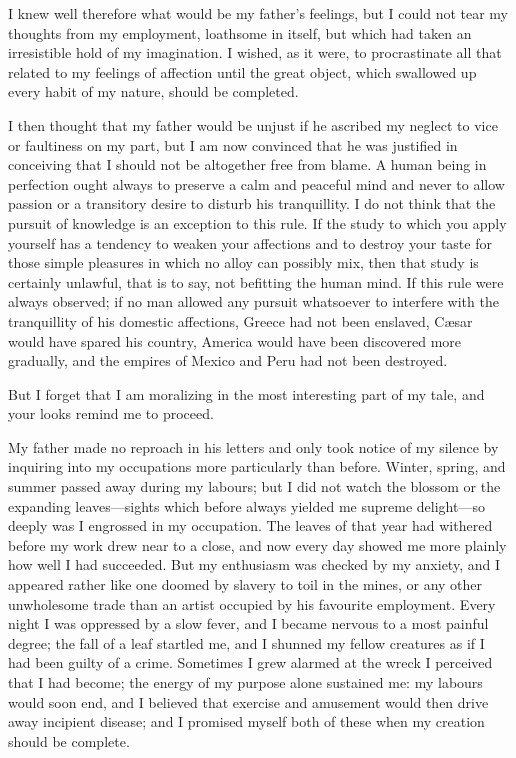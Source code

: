 \documentclass[12pt,openright]{book}
\begin{document}
I knew well therefore what would be my father’s feelings, but I could not tear my thoughts from my employment, loathsome in itself, but which had taken an irresistible hold of my imagination. I wished, as it were, to procrastinate all that related to my feelings of affection until the great object, which swallowed up every habit of my nature, should be completed.

I then thought that my father would be unjust if he ascribed my neglect to vice or faultiness on my part, but I am now convinced that he was justified in conceiving that I should not be altogether free from blame. A human being in perfection ought always to preserve a calm and peaceful mind and never to allow passion or a transitory desire to disturb his tranquillity. I do not think that the pursuit of knowledge is an exception to this rule. If the study to which you apply yourself has a tendency to weaken your affections and to destroy your taste for those simple pleasures in which no alloy can possibly mix, then that study is certainly unlawful, that is to say, not befitting the human mind. If this rule were always observed; if no man allowed any pursuit whatsoever to interfere with the tranquillity of his domestic affections, Greece had not been enslaved, Cæsar would have spared his country, America would have been discovered more gradually, and the empires of Mexico and Peru had not been destroyed.

But I forget that I am moralizing in the most interesting part of my tale, and your looks remind me to proceed.

My father made no reproach in his letters and only took notice of my silence by inquiring into my occupations more particularly than before. Winter, spring, and summer passed away during my labours; but I did not watch the blossom or the expanding leaves—sights which before always yielded me supreme delight—so deeply was I engrossed in my occupation. The leaves of that year had withered before my work drew near to a close, and now every day showed me more plainly how well I had succeeded. But my enthusiasm was checked by my anxiety, and I appeared rather like one doomed by slavery to toil in the mines, or any other unwholesome trade than an artist occupied by his favourite employment. Every night I was oppressed by a slow fever, and I became nervous to a most painful degree; the fall of a leaf startled me, and I shunned my fellow creatures as if I had been guilty of a crime. Sometimes I grew alarmed at the wreck I perceived that I had become; the energy of my purpose alone sustained me: my labours would soon end, and I believed that exercise and amusement would then drive away incipient disease; and I promised myself both of these when my creation should be complete.
\end{document}
